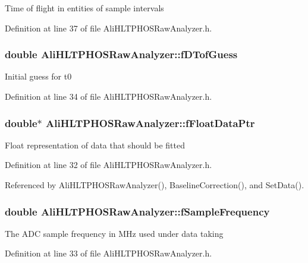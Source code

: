 Time of flight in entities of sample intervals 

Definition at line 37 of file Ali\-HLTPHOSRaw\-Analyzer.h.
\subsubsection{\setlength{\rightskip}{0pt plus 5cm}double {\bf Ali\-HLTPHOSRaw\-Analyzer::f\-DTof\-Guess}\hspace{0.3cm}{\tt  [protected]}}\label{classAliHLTPHOSRawAnalyzer_AliHLTPHOSRawAnalyzerPeakFinderp2}


Initial guess for t0 

Definition at line 34 of file Ali\-HLTPHOSRaw\-Analyzer.h.
\subsubsection{\setlength{\rightskip}{0pt plus 5cm}double$\ast$ {\bf Ali\-HLTPHOSRaw\-Analyzer::f\-Float\-Data\-Ptr}\hspace{0.3cm}{\tt  [protected]}}\label{classAliHLTPHOSRawAnalyzer_AliHLTPHOSRawAnalyzerPeakFinderp0}


Float representation of data that should be fitted 

Definition at line 32 of file Ali\-HLTPHOSRaw\-Analyzer.h.

Referenced by Ali\-HLTPHOSRaw\-Analyzer(), Baseline\-Correction(), and Set\-Data().
\subsubsection{\setlength{\rightskip}{0pt plus 5cm}double {\bf Ali\-HLTPHOSRaw\-Analyzer::f\-Sample\-Frequency}\hspace{0.3cm}{\tt  [protected]}}\label{classAliHLTPHOSRawAnalyzer_AliHLTPHOSRawAnalyzerPeakFinderp1}


The ADC sample frequency in MHz used under data taking 

Definition at line 33 of file Ali\-HLTPHOSRaw\-Analyzer.h.

